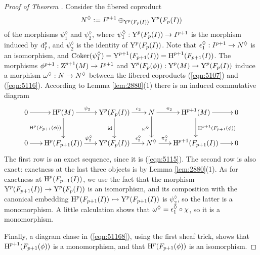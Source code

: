 \begin{proof}[Proof of Theorem \tup{\ref{thm:2880}}]
Consider the fibered coproduct 
\begin{equation} \label{eqn:5116}
N^{\lozenge} := I^{p + 1} \oplus_{\operatorname{Y}^p(F_p(I))} \operatorname{Y}^{p}(F_p(I))
\end{equation} 
of the morphisms $\psi_1^{\lozenge}$ and $\psi_2^{\lozenge}$,
where $\psi_1^{\lozenge} : \operatorname{Y}^{p}(F_p(I)) \to I^{p + 1}$
is the morphism induced by $\mathrm{d}_I^p$, and 
$\psi_2^{\lozenge}$ is the identity of $\operatorname{Y}^{p}(F_p(I))$. 
Note that $\epsilon_1^{\lozenge} : I^{p + 1} \to N^{\lozenge}$ is an isomorphism, 
and 
$\operatorname{Coker}(\psi_1^{\lozenge}) = \operatorname{Y}^{p + 1}(F_{p + 1}(I)) = 
\operatorname{H}^{p + 1}(F_{p + 1}(I))$. 
The morphisms 
$\phi^{p + 1} : \operatorname{Z}^{p + 1}(M) \to I^{p + 1}$
and 
$\operatorname{Y}^{p}(F_{p}(\phi)) : \operatorname{Y}^{p}(M) \to \operatorname{Y}^{p}(F_{p}(I))$
induce a morphism 
$\omega^{\lozenge} : N \to N^{\lozenge}$ between the fibered coproducts 
(\ref{eqn:5107}) 
and (\ref{eqn:5116}). According to Lemma \ref{lem:2880}(1) there is an 
induced commutative diagram
\begin{equation} \label{eqn:51168}
\UseTips \xymatrix @C=4ex @R=6ex {
0
\ar[r]
&
\opn{H}^{p}(M)
\ar[r]^(0.47){\psi_2}
\ar[d]_{\opn{H}^{p}(F_{p + 1}(\phi))}
&
\opn{Y}^{p}(F_{p}(I))
\ar[r]^(0.65){\ep_2}
\ar[d]_{\opn{id}}
&
N
\ar[r]^(0.4){\pi_2}
\ar[d]_{\om^{\lozenge}}
&
\opn{H}^{p + 1}(M)
\ar[r]
\ar[d]^{\opn{H}^{p + 1}(F_{p + 1}(\phi))}
&
0
\\
0
\ar[r]
&
\opn{H}^{p}(F_{p + 1}(I))
\ar[r]^{\psi_2^{\lozenge}}
&
\opn{Y}^{p}(F_{p}(I))
\ar[r]^(0.65){\ep_2^{\lozenge}}
&
N^{\lozenge}
\ar[r]^(0.3){\pi_2^{\lozenge}}
&
\opn{H}^{p + 1}(F_{p + 1}(I))
\ar[r]
&
0
} 
\end{equation}
The first row is an exact sequence, since it is (\ref{eqn:5115}).
The second row is also exact: exactness at the last three objects is by 
Lemma \ref{lem:2880}(1). As for exactness at $\operatorname{H}^{p}(F_{p + 1}(I))$,
we use the fact that the morphism 
$\operatorname{Y}^{p}(F_{p + 1}(I)) \to \operatorname{Y}^{p}(F_{p}(I))$
is an isomorphism, and its composition with  the canonical embedding 
$\operatorname{H}^{p}(F_{p + 1}(I)) \rightarrowtail \operatorname{Y}^{p}(F_{p + 1}(I))$
is $\psi_2^{\lozenge}$, so the latter is a monomorphism.
A little calculation shows that $\omega^{\lozenge} = \epsilon_1^{\lozenge} \circ \chi$, 
so it is a monomorphism. 

Finally, a diagram chase in (\ref{eqn:51168}), using the first sheaf trick, 
shows that $\operatorname{H}^{p + 1}(F_{p + 1}(\phi))$
is a monomorphism, and that $\operatorname{H}^{p}(F_{p + 1}(\phi))$
is an isomorphism. 
\end{proof}

